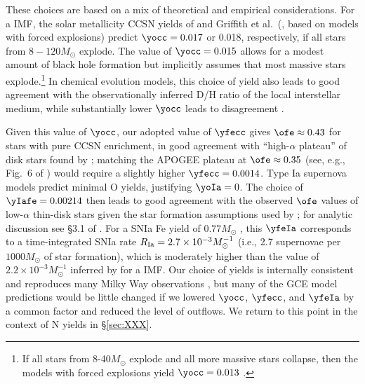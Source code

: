 
These choices are based on a mix of theoretical and empirical considerations.
For a \cite{Kroupa2001} IMF, the solar metallicity CCSN yields of
\cite{Limongi2006} and Griffith et al.\ (\citeyear{Griffith2021x},
based on \citealt{Sukhbold2016} models with forced explosions)
predict $\yocc = 0.017$ or 0.018, respectively, if all stars from 
$8-120 M_\odot$ explode.  The value of $\yocc=0.015$ allows for a modest 
amount of black hole formation but implicitly assumes that most massive
stars explode.\footnote{If all stars from 8-40$M_\odot$ explode and all
more massive stars collapse, then the \cite{Sukhbold2016} models with 
forced explosions yield $\yocc=0.013$ \citep{Griffith2021x}.}
In chemical evolution models, this choice of yield also leads to good
agreement with the observationally inferred D/H ratio \citep{Linsky2006}
of the local interstellar medium, while substantially lower $\yocc$ leads
to disagreement \citep{Weinberg2017b}.

Given this value of $\yocc$, our adopted value of $\yfecc$ gives
$\ofe \approx 0.43$ for stars with pure CCSN enrichment, in good agreement
with ``high-$\alpha$ plateau'' of disk stars found by \cite{Ramirez2013};
matching the APOGEE plateau at $\ofe \approx 0.35$ 
(see, e.g., Fig.~6 of \cite{Hasselquist2021}) would require a slightly
higher $\yfecc=0.0014$.
Type Ia supernova models predict minimal O yields, justifying $\yoIa=0$.  
The choice of $\yIafe = 0.00214$ then leads to good agreement with the
observed $\ofe$ values of low-$\alpha$ thin-disk stars given the star 
formation assumptions used by \cite{Johnson2021}; for analytic
discussion see \S 3.1 of \cite{Weinberg2017}.
For a SNIa Fe yield of $0.77 M_\odot$ \citep{Iwamoto1999}, this
$\yfeIa$ corresponds to a time-integrated SNIa rate
$R_{\rm Ia} = 2.7 \times 10^{-3} M_\odot^{-1}$ (i.e., 2.7 supernovae
per $1000 M_\odot$ of star formation), which is moderately higher than
the value of $2.2 \times 10^{-3} M_\odot^{-1}$ inferred by \cite{Maoz2012}
for a \cite{Kroupa2001} IMF.  Our choice of yields is internally consistent
and reproduces many Milky Way observations \citep{Johnson2021}, but
many of the GCE model predictions would be little changed if we lowered
$\yocc$, $\yfecc$, and $\yfeIa$ by a common factor and reduced the
level of outflows.  We return to this point in the context of N yields
in \S\ref{sec:XXX}.

